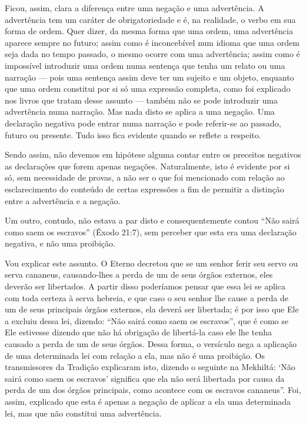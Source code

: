 Ficou, assim, clara a diferença entre uma negação e uma advertência. A
advertência tem um caráter de obrigatoriedade e é, na realidade, o verbo
em sua forma de ordem. Quer dizer, da mesma forma que uma ordem, uma
advertência aparece sempre no futuro; assim como é inconcebível num
idioma que uma ordem seja dada no tempo passado, o mesmo ocorre com uma
advertência; assim como é impossível introduzir uma ordem numa sentença
que tenha um relato ou uma narração --- pois uma sentença assim deve
ter um sujeito e um objeto, enquanto que uma ordem constitui por si só
uma expressão completa, como foi explicado nos livros que tratam desse
assunto --- também não se pode introduzir uma advertência numa narração.
Mas nada disto se aplica a uma negação. Uma declaração negativa pode
entrar numa narração e pode referir-se ao passado, futuro ou presente.
Tudo isso fica evidente quando se reflete a respeito.

Sendo assim, não devemos em hipótese alguma contar entre os preceitos
negativos as declarações que forem apenas negações. Naturalmente, isto é
evidente por si só, sem necessidade de provas, a não ser o que foi
mencionado com relação ao esclarecimento do conteúdo de certas
expressões a fim de permitir a distinção entre a advertência e a
negação.

Um outro, contudo, não estava a par disto e consequentemente contou
``Não sairá como saem os escravos'' (Êxodo 21:7), sem perceber que esta
era uma declaração negativa, e não uma proibição.

Vou explicar este assunto. O Eterno decretou que se um senhor ferir seu
servo ou serva cananeus, causando-lhes a perda de um de seus órgãos
externos, eles deverão ser libertados. A partir disso poderíamos pensar
que essa lei se aplica com toda certeza à serva hebreia, e que caso o
seu senhor lhe cause a perda de um de seus principais órgãos externos,
ela deverá ser libertada; é por isso que Ele a excluiu dessa lei,
dizendo: ``Não sairá como saem os escravos'', que é como se Ele
estivesse dizendo que não há obrigação de libertá-la caso ele lhe tenha
causado a perda de um de seus órgãos. Dessa forma, o versículo nega a
aplicação de uma determinada lei com relação a ela, mas não é uma
proibição. Os transmissores da Tradição explicaram isto, dizendo o
seguinte na Mekhiltá: `Não sairá como saem os escravos' significa que
ela não será libertada por causa da perda de um dos órgãos principais,
como acontece com os escravos cananeus''. Foi, assim, explicado que esta
é apenas a negação de aplicar a ela uma determinada lei, mas que não
constitui uma advertência.


